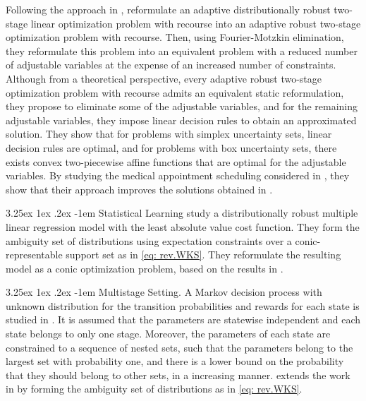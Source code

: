 \documentclass[final,onefignum,onetabnum]{class}
\makeatletter
\renewcommand\paragraph{\@startsection{paragraph}{4}{\z@}%
  {3.25ex \@plus1ex \@minus.2ex}%
  {-1em}%
  {\normalfont\normalsize\bfseries}}
\makeatother
\begin{document}
Following the approach in \citet{bertsimas2018adaptiveDRO}, \citet{zhen2018} reformulate  an adaptive distributionally robust two-stage linear optimization problem with recourse into an adaptive robust two-stage optimization problem with recourse.  Then, using \linebreak Fourier-Motzkin elimination, they reformulate this problem into an equivalent problem with a reduced number of adjustable variables at the expense of an increased number of constraints. Although from a theoretical perspective,
every adaptive robust two-stage optimization problem with recourse  admits an equivalent static
reformulation, they propose to eliminate some of the adjustable variables,  and for the   remaining
adjustable variables, they impose linear decision rules to obtain an approximated solution.
They show that for problems with  simplex uncertainty sets, linear decision rules are optimal, and for problems  with box uncertainty sets,
 there exists convex two-piecewise affine functions
that are optimal for the adjustable variables. By studying the  medical appointment scheduling considered in \citet{bertsimas2018adaptiveDRO}, they show that their approach improves the solutions obtained in \citet{bertsimas2018adaptiveDRO}.

\paragraph{Statistical Learning}
\citet{gong2018} study a distributionally robust multiple linear regression model with the least absolute value cost function. They form the ambiguity set of distributions using expectation constraints over a conic-representable support set as in \eqref{eq: rev.WKS}. They reformulate the resulting model as a conic optimization problem, based on the results in \citet{wiesemann2014}. 


\paragraph{Multistage Setting.} 
A Markov decision process with unknown distribution for the transition probabilities and rewards for each state is studied in \citet{xu2012MDP,xu2010MDP}. It is assumed that the parameters are statewise independent and each state belongs to only one stage. Moreover, the parameters of each state are constrained to a 
sequence of nested sets, such that the parameters  belong to the largest set with probability one, and there is a lower bound on the probability that they should belong to other sets, in a increasing manner. 
\citet{yu2016dMDP} extends the work in \citet{xu2012MDP,xu2010MDP} by forming the ambiguity set of distributions as in \eqref{eq: rev.WKS}. 
\end{document}
